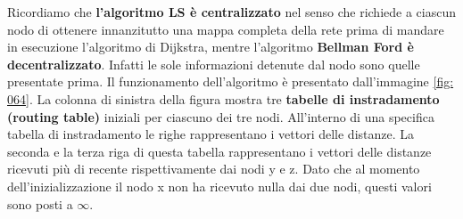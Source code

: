 \documentclass[11pt,a4paper]{book}
\begin{document}
Ricordiamo che \textbf{l'algoritmo LS è centralizzato} nel senso che richiede a ciascun nodo di ottenere innanzitutto una mappa completa della rete prima di mandare in esecuzione l'algoritmo di Dijkstra, mentre l'algoritmo \textbf{Bellman Ford è decentralizzato}. Infatti le sole informazioni detenute dal nodo sono quelle presentate prima. Il funzionamento dell'algoritmo è presentato dall'immagine \ref{fig: 064}. La colonna di sinistra della figura mostra tre \textbf{tabelle di instradamento (routing table)} iniziali per ciascuno dei tre nodi. All'interno di una specifica tabella di instradamento le righe rappresentano i vettori delle distanze. La seconda e la terza riga di questa tabella rappresentano i vettori delle distanze ricevuti più di recente rispettivamente dai nodi y e z. Dato che al  momento dell'inizializzazione il nodo x non ha ricevuto nulla dai due nodi, questi valori sono posti a $\infty$.
\end{document}
